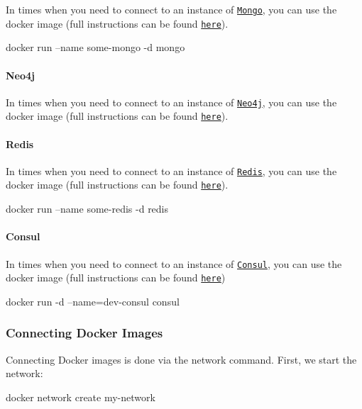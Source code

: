 In times when you need to connect to an instance of \href{https://www.mongodb.com}{\tt Mongo}, you can use the docker image (full instructions can be found \href{https://hub.docker.com/_/mongo/}{\tt here}). \begin{DoxyVerb}docker run --name some-mongo -d mongo
\end{DoxyVerb}


\paragraph*{Neo4j}

In times when you need to connect to an instance of \href{https://neo4j.com/}{\tt Neo4j}, you can use the docker image (full instructions can be found \href{https://hub.docker.com/_/neo4j/}{\tt here}). 


\paragraph*{Redis}

In times when you need to connect to an instance of \href{http://redis.io/}{\tt Redis}, you can use the docker image (full instructions can be found \href{https://hub.docker.com/_/redis/}{\tt here}). \begin{DoxyVerb}docker run --name some-redis -d redis
\end{DoxyVerb}


\paragraph*{Consul}

In times when you need to connect to an instance of \href{https://www.consul.io/}{\tt Consul}, you can use the docker image (full instructions can be found \href{https://hub.docker.com/_/consul/}{\tt here}) \begin{DoxyVerb}docker run -d --name=dev-consul consul
\end{DoxyVerb}


\subsubsection*{Connecting Docker Images}

Connecting Docker images is done via the network command. First, we start the network\+: \begin{DoxyVerb}docker network create my-network
\end{DoxyVerb}


